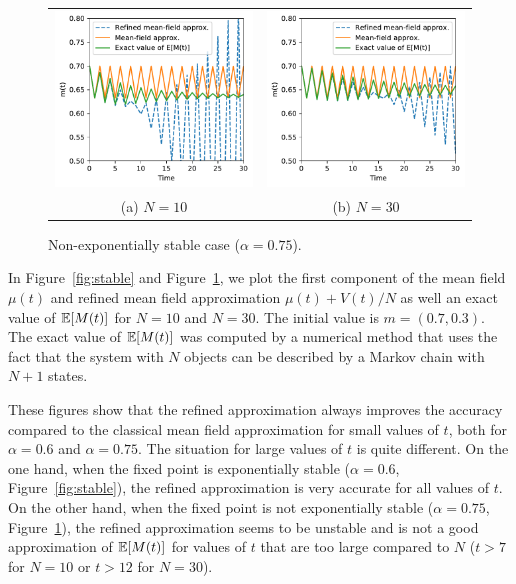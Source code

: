 \documentclass{amsart}
\begin{document}
\begin{figure}[ht]
  \centering
  \begin{tabular}{@{}c@{}c@{}}
    \includegraphics[width=.5\linewidth]{unstable1D_a75_N10}
    &\includegraphics[width=.5\linewidth]{unstable1D_a75_N30}\\[-5pt]
    (a) $N=10$ & (b) $N=30$\vspace{-.3cm}
  \end{tabular}
  \caption{Non-exponentially stable case ($\alpha=0.75$). }
  \label{fig:unstable}
\end{figure}

In Figure~\ref{fig:stable} and Figure~\ref{fig:unstable}, we plot the
first component of the mean field $\mu(t)$ and refined mean field
approximation $\mu(t)+V(t)/N$ as well an exact value of $\esp{M(t)}$
for $N=10$ and $N=30$. The initial value is $m=(0.7,0.3)$. The exact
value of $\esp{M(t)}$ was computed by a numerical method that uses the
fact that the system with $N$ objects can be described by a Markov
chain with $N+1$ states.

These figures show that the refined approximation always improves the
accuracy compared to the classical mean field approximation for small
values of $t$, both for $\alpha=0.6$ and $\alpha=0.75$. The situation
for large values of $t$ is quite different. On the one hand, when the
fixed point is exponentially stable ($\alpha=0.6$,
Figure~\ref{fig:stable}), the refined approximation is very accurate
for all values of $t$. On the other hand, when the fixed point is not
exponentially stable ($\alpha=0.75$, Figure~\ref{fig:unstable}), the
refined approximation seems to be unstable and is not a good
approximation of $\esp{M(t)}$ for values of $t$ that are too large
compared to $N$ ($t>7$ for $N=10$ or $t>12$ for $N=30$).
\end{document}
